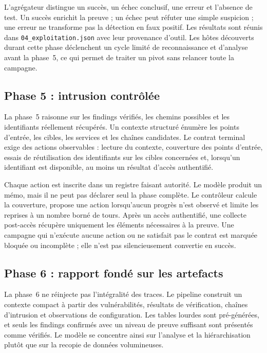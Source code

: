 L'agrégateur distingue un succès, un échec conclusif, une erreur et l'absence de
test. Un succès enrichit la preuve ; un échec peut réfuter une simple suspicion ;
une erreur ne transforme pas la détection en faux positif. Les résultats sont
réunis dans \texttt{\footnotesize 04\_exploitation.json} avec leur provenance d'outil. Les
hôtes découverts durant cette phase déclenchent un cycle limité de reconnaissance
et d'analyse avant la phase~5, ce qui permet de traiter un pivot sans relancer
toute la campagne.

\subsection{Phase 5 : intrusion contrôlée}

La phase~5 raisonne sur les findings vérifiés, les chemins possibles et les
identifiants réellement récupérés. Un contexte structuré énumère les points
d'entrée, les cibles, les services et les chaînes candidates. Le contrat terminal
exige des actions observables : lecture du contexte, couverture des points
d'entrée, essais de réutilisation des identifiants sur les cibles concernées et,
lorsqu'un identifiant est disponible, au moins un résultat d'accès authentifié.

Chaque action est inscrite dans un registre faisant autorité. Le modèle produit
un mémo, mais il ne peut pas déclarer seul la phase complète. Le contrôleur
calcule la couverture, propose une action lorsqu'aucun progrès n'est observé et
limite les reprises à un nombre borné de tours. Après un accès authentifié, une
collecte post-accès récupère uniquement les éléments nécessaires à la preuve.
Une campagne qui n'exécute aucune action ou ne satisfait pas le contrat est
marquée bloquée ou incomplète ; elle n'est pas silencieusement convertie en
succès.

\subsection{Phase 6 : rapport fondé sur les artefacts}

La phase~6 ne réinjecte pas l'intégralité des traces. Le pipeline construit un
contexte compact à partir des vulnérabilités, résultats de vérification, chaînes
d'intrusion et observations de configuration. Les tables lourdes sont
pré-générées, et seuls les findings confirmés avec un niveau de preuve suffisant
sont présentés comme vérifiés. Le modèle se concentre ainsi sur l'analyse et la
hiérarchisation plutôt que sur la recopie de données volumineuses.

